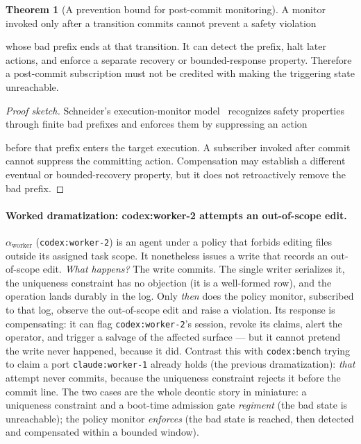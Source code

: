 \documentclass[11pt,a4paper]{article}
\theoremstyle{definition}
\newtheorem{theorem}{Theorem}[section]
\theoremstyle{remark}
\begin{document}
\begin{theorem}[A prevention bound for post-commit monitoring]\label{thm:schneider}
\setlength{\parskip}{4pt plus 1pt}
A monitor invoked only after a transition commits cannot prevent a safety violation

whose bad prefix ends at that transition. It can detect the prefix, halt later
actions, and enforce a separate recovery or bounded-response property. Therefore a
post-commit subscription must not be credited with making the triggering state
unreachable.
\end{theorem}

\begin{proof}[Proof sketch]
\setlength{\parskip}{4pt plus 1pt}
Schneider's execution-monitor model~ recognizes safety
properties through finite bad prefixes and enforces them by suppressing an action

before that prefix enters the target execution. A subscriber invoked after commit
cannot suppress the committing action. Compensation may establish a different
eventual or bounded-recovery property, but it does not retroactively remove the bad
prefix.
\end{proof}

\paragraph{Worked dramatization: codex:worker-2 attempts an out-of-scope edit.}
$\alpha_{\text{worker}}$ (\texttt{codex:worker-2}) is an agent under a policy that forbids editing files outside its assigned task
scope. It nonetheless issues a write that records an out-of-scope edit. \emph{What
happens?} The write commits. The single writer serializes it, the uniqueness
constraint has no objection (it is a well-formed row), and the operation lands
durably in the log. Only \emph{then} does the policy monitor, subscribed to that
log, observe the out-of-scope edit and raise a violation. Its response is
compensating: it can flag \texttt{codex:worker-2}'s session, revoke its claims, alert the operator, and
trigger a salvage of the affected surface --- but it cannot pretend the write never
happened, because it did. Contrast this with \texttt{codex:bench} trying to claim a port \texttt{claude:worker-1}
already holds (the previous dramatization): \emph{that} attempt never commits,
because the uniqueness constraint rejects it before the commit line. The two cases
are the whole deontic story in miniature: a uniqueness constraint and a boot-time
admission gate \emph{regiment} (the bad state is unreachable); the policy monitor
\emph{enforces} (the bad state is reached, then detected and compensated within a
bounded window).
\end{document}
